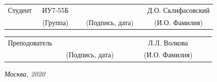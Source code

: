 \documentclass[14pt, a4paper]{extarticle}
\begin{document}
\noindent
{}
\\

\noindent
{}
\\

\vspace{1.5cm}
\noindent
\begin{tabular}{l c c c c c}
	Студент      & ~ИУ7-55Б~               & \hspace{2.5cm} & \hspace{2cm}                 & &  Д.О. Склифасовский \\\cline{2-2}\cline{4-4} \cline{6-6} 
	\hspace{3cm} & {\footnotesize(Группа)} &                & {\footnotesize(Подпись, дата)} & & {\footnotesize(И.О. Фамилия)}
\end{tabular}

\noindent
\begin{tabular}{l c c c c}
	Преподователь & \hspace{5cm}   & \hspace{2cm}                 & & ~~~~~~Л.Л. Волкова~~~~~~\\\cline{3-3} \cline{5-5} 
	\hspace{3cm}  &                & {\footnotesize(Подпись, дата)} & & {\footnotesize(И.О. Фамилия)}
\end{tabular}

\vspace{0.6cm}
\begin{center}	
	\vfill
	\large \textit {Москва, 2020}
\end{center}

\thispagestyle {empty}
\pagebreak

\clearpage
\tableofcontents


\clearpage
\end{document}
